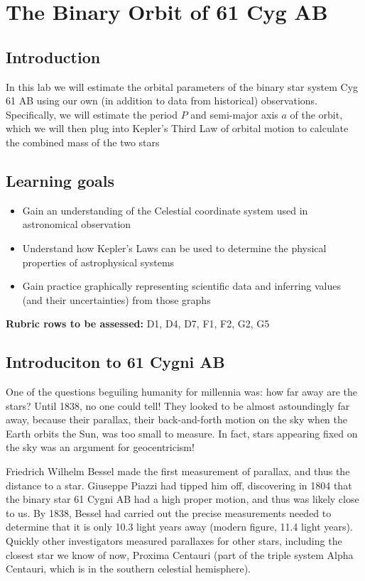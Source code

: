 \chapter{The Binary Orbit of 61 Cyg AB}


\section{Introduction}

In this lab we will estimate the orbital parameters of the binary star system Cyg 61 AB using our own (in addition to data from historical) observations. Specifically, we will estimate the period $P$ and semi-major axis $a$ of the orbit, which we will then plug into Kepler's Third Law of orbital motion to calculate the combined mass of the two stars

\section{Learning goals}

\begin{itemize}
\item Gain an understanding of the Celestial coordinate system used in astronomical observation
\item Understand how Kepler's Laws can be used to determine the physical properties of astrophysical systems
\item Gain practice graphically representing scientific data and inferring values (and their uncertainties) from those graphs
\end{itemize}

\textbf{Rubric rows to be assessed:} D1, D4, D7, F1, F2, G2, G5

\section{Introduciton to 61 Cygni AB}
One of the questions beguiling humanity for millennia was: how far away are the stars?  Until 1838, no one could tell!  They looked to be almost astoundingly far away, because their parallax, their back-and-forth motion on the sky when the Earth orbits the Sun, was too small to measure.  In fact, stars appearing fixed on the sky was an argument for geocentricism!

Friedrich Wilhelm Bessel made the first measurement of parallax, and thus the distance to a star. Giuseppe Piazzi had tipped him off, discovering in 1804 that the binary star 61 Cygni AB had a high proper motion, and thus was likely close to us. By 1838, Bessel had carried out the precise measurements needed to determine that it is only 10.3 light years away (modern figure, 11.4 light years).  Quickly other investigators measured parallaxes for other stars, including the closest star we know of now, Proxima Centauri (part of the triple system Alpha Centauri, which is in the southern celestial hemisphere).  %

